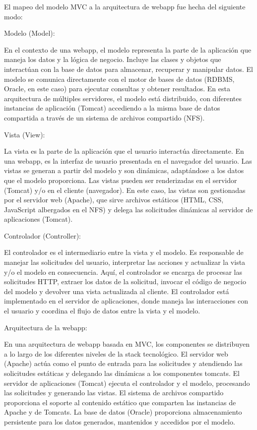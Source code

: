 El mapeo del modelo MVC a la arquitectura de webapp fue hecha del siguiente modo:

Modelo (Model):

En el contexto de una webapp, el modelo representa la parte de la aplicación que maneja los datos y la lógica de negocio. Incluye las clases y objetos que interactúan con la base de datos para almacenar, recuperar y manipular datos.
El modelo se comunica directamente con el motor de bases de datos (RDBMS, Oracle, en este caso) para ejecutar consultas y obtener resultados.
En esta arquitectura de múltiples servidores, el modelo está distribuido, con diferentes instancias de aplicación (Tomcat) accediendo a la misma base de datos compartida a través de un sistema de archivos compartido (NFS).

Vista (View):

La vista es la parte de la aplicación que el usuario interactúa directamente. En una webapp, es la interfaz de usuario presentada en el navegador del usuario.
Las vistas se generan a partir del modelo y son dinámicas, adaptándose a los datos que el modelo proporciona. Las vistas pueden ser renderizadas en el servidor (Tomcat) y/o en el cliente (navegador).
En este caso, las vistas son gestionadas por el servidor web (Apache), que sirve archivos estáticos (HTML, CSS, JavaScript albergados en el NFS) y delega las solicitudes dinámicas al servidor de aplicaciones (Tomcat).

Controlador (Controller):

El controlador es el intermediario entre la vista y el modelo. Es responsable de manejar las solicitudes del usuario, interpretar las acciones y actualizar la vista y/o el modelo en consecuencia.
Aquí, el controlador se encarga de procesar las solicitudes HTTP, extraer los datos de la solicitud, invocar el código de negocio del modelo y devolver una vista actualizada al cliente.
El controlador está implementado en el servidor de aplicaciones, donde maneja las interacciones con el usuario y coordina el flujo de datos entre la vista y el modelo.

Arquitectura de la webapp:

En una arquitectura de webapp basada en MVC, los componentes se distribuyen a lo largo de los diferentes niveles de la stack tecnológico.
El servidor web (Apache) actúa como el punto de entrada para las solicitudes y atendiendo las solicitudes estáticas y delegando las dinámicas a los componentes tomcats.
El servidor de aplicaciones (Tomcat) ejecuta el controlador y el modelo, procesando las solicitudes y generando las vistas.
El sistema de archivos compartido proporciona el soporte al contenido estático que comparten las instancias de Apache y de Tomcats.
La base de datos (Oracle) proporciona almacenamiento persistente para los datos generados, mantenidos y accedidos por el modelo.

